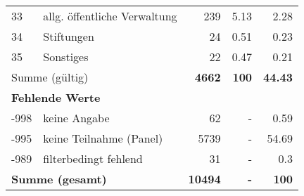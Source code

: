\begin{longtable}{lXrrr}
        33 & \multicolumn{1}{X}{allg. öffentliche Verwaltung} & %
          \num{239} &
          \num[round-mode=places,round-precision=2]{5.13} &
          \num[round-mode=places,round-precision=2]{2.28} \\

        34 & \multicolumn{1}{X}{Stiftungen} & %
          \num{24} &
          \num[round-mode=places,round-precision=2]{0.51} &
          \num[round-mode=places,round-precision=2]{0.23} \\

        35 & \multicolumn{1}{X}{Sonstiges} & %
          \num{22} &
          \num[round-mode=places,round-precision=2]{0.47} &
          \num[round-mode=places,round-precision=2]{0.21} \\

     \midrule
     \multicolumn{2}{l}{Summe (gültig)} &
       \textbf{\num{4662}} &
     \textbf{\num{100}} &
       \textbf{\num[round-mode=places,round-precision=2]{44.43}} \\
     \multicolumn{5}{l}{\textbf{Fehlende Werte}}\\
       -998 &
       keine Angabe &
         \num{62} &
        - &
         \num[round-mode=places,round-precision=2]{0.59} \\
       -995 &
       keine Teilnahme (Panel) &
         \num{5739} &
        - &
         \num[round-mode=places,round-precision=2]{54.69} \\
       -989 &
       filterbedingt fehlend &
         \num{31} &
        - &
         \num[round-mode=places,round-precision=2]{0.3} \\
     \midrule
     \multicolumn{2}{l}{\textbf{Summe (gesamt)}} &
          \textbf{\num{10494}} &
        \textbf{-} &
        \textbf{\num{100}} \\
     \bottomrule
     \end{longtable}
     

